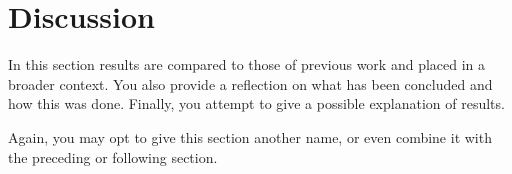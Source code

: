 \section{Discussion}
In this section results are compared to those of previous work and placed in a broader context. You also provide a reflection on what has been concluded and how this was done. Finally, you attempt to give a possible explanation of results.

Again, you may opt to give this section another name, or even combine it with the preceding or following section.